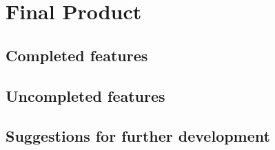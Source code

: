 \chapter{Final Product}

\section{Completed features}
\section{Uncompleted features}
\section{Suggestions for further development}




